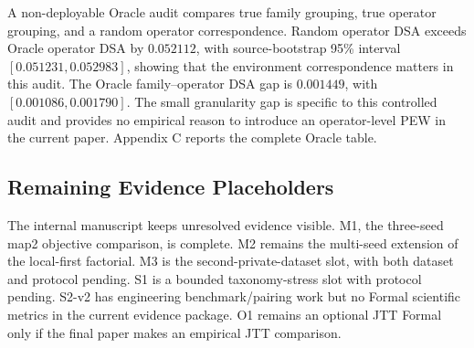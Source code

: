 A non-deployable Oracle audit compares true family grouping, true operator grouping, and a random operator correspondence. Random operator DSA exceeds Oracle operator DSA by \(0.052112\), with source-bootstrap 95\% interval \([0.051231,0.052983]\), showing that the environment correspondence matters in this audit. The Oracle family--operator DSA gap is \(0.001449\), with \([0.001086,0.001790]\). The small granularity gap is specific to this controlled audit and provides no empirical reason to introduce an operator-level PEW in the current paper. Appendix C reports the complete Oracle table.

\subsection{Remaining Evidence Placeholders}

The internal manuscript keeps unresolved evidence visible. M1, the three-seed map2 objective comparison, is complete. M2 remains the multi-seed extension of the local-first factorial. M3 is the second-private-dataset slot, with both dataset and protocol pending. S1 is a bounded taxonomy-stress slot with protocol pending. S2-v2 has engineering benchmark/pairing work but no Formal scientific metrics in the current evidence package. O1 remains an optional JTT Formal only if the final paper makes an empirical JTT comparison.


